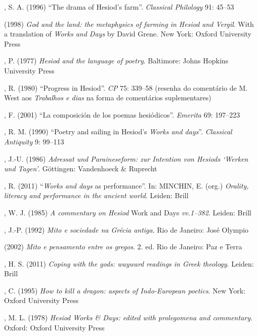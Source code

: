 \begin{bibliohedra}
, S. A. (1996) “The drama of Hesiod’s farm”. \textit{Classical
Philology} 91: 45--53

\titidem (1998) \textit{God and the land: the metaphysics of farming in
Hesiod and Vergil}. With a translation of \textit{Works and Days} by
David Grene. New York: Oxford University Press 
  
, P. (1977) \textit{Hesiod and the language of poetry}. Baltimore:
Johns Hopkins University Press
  
, R. (1980) “Progress in Hesiod”. \textit{CP} 75: 339--58 (resenha
do comentário de M. West aos \textit{Trabalhos e dias} na forma de
comentários suplementares)
  
, F. (2001) “La composición de los poemas hesiódicos”.
\textit{Emerita} 69: 197--223
  
, R. M. (1990) “Poetry and sailing in Hesiod’s \textit{Works and
days}”. \textit{Classical Antiquity} 9: 99--113
  
, J.-U. (1986) \textit{Adressat und Paraineseform: zur Intention
von Hesiods ‘Werken und Tagen’}.  Göttingen: Vandenhoeck \& Ruprecht
  
, R. (2011) “\textit{Works and days} as performance”. In: MINCHIN,
E. (org.) \textit{Orality, literacy and performance in the ancient
world}. Leiden: Brill
  
, W. J. (1985) \textit{A commentary on Hesiod} Work and
Days\textit{ vv.1--382}. Leiden: Brill
  
, J.-P. (1992) \textit{Mito e sociedade na Grécia antiga}. Rio de
Janeiro: José Olympio

\titidem (2002) \textit{Mito e pensamento entre os gregos}. 2. ed. Rio de
Janeiro: Paz e Terra
  
, H. S. (2011) \textit{Coping with the gods: wayward readings in
Greek theology}. Leiden: Brill 
 
, C. (1995) \textit{How to kill a dragon: aspects of
Indo-European poetics}. New York: Oxford University Press 
  
, M. L. (1978) \textit{Hesiod Works \& Days: edited with prolegomena
and commentary}. Oxford: Oxford University Press
\end{bibliohedra}

